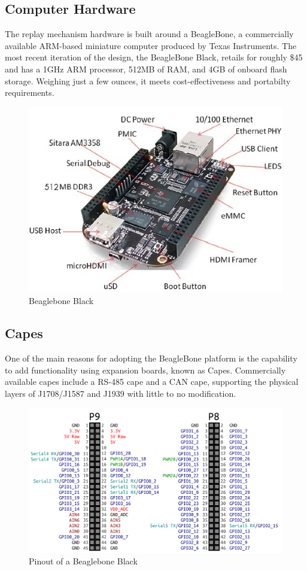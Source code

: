 \subsection{Computer Hardware}

The replay mechanism hardware is built around a BeagleBone, a commercially available ARM-based miniature computer produced
by Texas Instruments\cite{BeagleBone}. The most recent iteration of the design, the BeagleBone Black, retails for roughly \$45 and has a 1GHz ARM
processor, 512MB of RAM, and 4GB of onboard flash storage. Weighing just a few ounces, it meets cost-effectiveness and portabilty
requirements.

\begin{figure}[h]
  \centering
  \includegraphics{BeagleBoneBlack}
  \caption{Beaglebone Black}
  \label{fig:BBB}
\end{figure}

\subsection{Capes}

One of the main reasons for adopting the BeagleBone platform is the capability to add functionality using expansion boards, known
as Capes. Commercially available capes include a RS-485 cape and a CAN cape, supporting the physical layers of J1708/J1587 and J1939
with little to no modification.


\begin{figure}[h]
  \centering
  \includegraphics{BeaglebonePinout}
  \caption{Pinout of a Beaglebone Black}
  \label{fig:BBB-pinout}
\end{figure}


